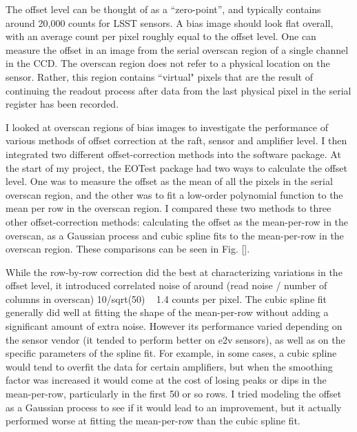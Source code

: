 The offset level can be thought of as a ``zero-point'', and typically contains around 20,000 counts for LSST sensors. A bias image should look flat overall, with an average count per pixel roughly equal to the offset level. One can measure the offset in an image from the serial overscan region of a single channel in the CCD. The overscan region does not refer to a physical location on the sensor. Rather, this region contains ``virtual" pixels that are the result of continuing the readout process after data from the last physical pixel in the serial register has been recorded. 

I looked at overscan regions of bias images to investigate the performance of various methods of offset correction at the raft, sensor and amplifier level. I then integrated two different offset-correction methods into the  software package. At the start of my project, the EOTest package had two ways to calculate the offset level. One was to measure the offset as the mean of all the pixels in the serial overscan region, and the other was to fit a low-order polynomial function to the mean per row in the overscan region. I compared these two methods to three other offset-correction methods: calculating the offset as the mean-per-row in the overscan, as a Gaussian process and cubic spline fits to the mean-per-row in the overscan region. These comparisons can be seen in Fig. [].


While the row-by-row correction did the best at characterizing variations in the offset level, it introduced correlated noise of around (read noise / number of columns in overscan) 10/sqrt(50) ~ 1.4 counts per pixel. The cubic spline fit generally did well at fitting the shape of the mean-per-row without adding a significant amount of extra noise. However its performance varied depending on the sensor vendor (it tended to perform better on e2v sensors), as well as on the specific parameters of the spline fit. For example, in some cases, a cubic spline would tend to overfit the data for certain amplifiers, but when the smoothing factor was increased it would come at the cost of losing peaks or dips in the mean-per-row, particularly in the first 50 or so rows. I tried modeling the offset as a Gaussian process to see if it would lead to an improvement, but it actually performed worse at fitting the mean-per-row than the cubic spline fit. 

